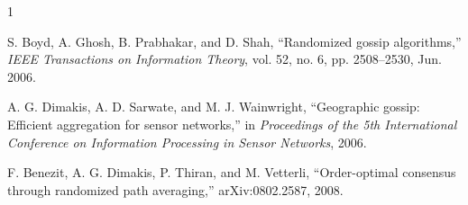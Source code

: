 \documentclass[conference]{IEEEtran}
\begin{document}
\begin{thebibliography}{1}

S. Boyd, A. Ghosh, B. Prabhakar, and D. Shah, ``Randomized gossip algorithms,'' \emph{IEEE Transactions on Information Theory}, vol. 52, no. 6, pp. 2508--2530, Jun. 2006.

A. G. Dimakis, A. D. Sarwate, and M. J. Wainwright, ``Geographic gossip: Efficient aggregation for sensor networks,'' in \emph{Proceedings of the 5th International Conference on Information Processing in Sensor Networks}, 2006.

F. Benezit, A. G. Dimakis, P. Thiran, and M. Vetterli, ``Order-optimal consensus through randomized path averaging,'' arXiv:0802.2587, 2008.

\end{thebibliography}
\end{document}
